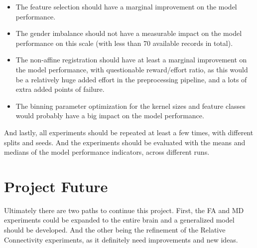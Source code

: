 \begin{itemize}
  \item The feature selection should have a marginal improvement on the model performance.
  \item The gender imbalance should not have a measurable impact on the model performance on this scale (with less than 70 available records in total).
  \item The non-affine registration should have at least a marginal improvement on the model performance, with questionable reward/effort ratio, as this would be a relatively huge added effort in the preprocessing pipeline, and a lots of extra added points of failure.
  \item The binning parameter optimization for the kernel sizes and feature classes would probably have a big impact on the model performance.
\end{itemize}
And lastly, all experiments should be repeated at least a few times, with different splits and seeds. And the experiments should be evaluated with the means and medians of the model performance indicators, across different runs.

\section{Project Future}

Ultimately there are two paths to continue this project. First, the \ac{FA} and \ac{MD} experiments could be expanded to the entire brain and a generalized model should be developed. And the other being the refinement of the Relative Connectivity experiments, as it definitely need improvements and new ideas.


